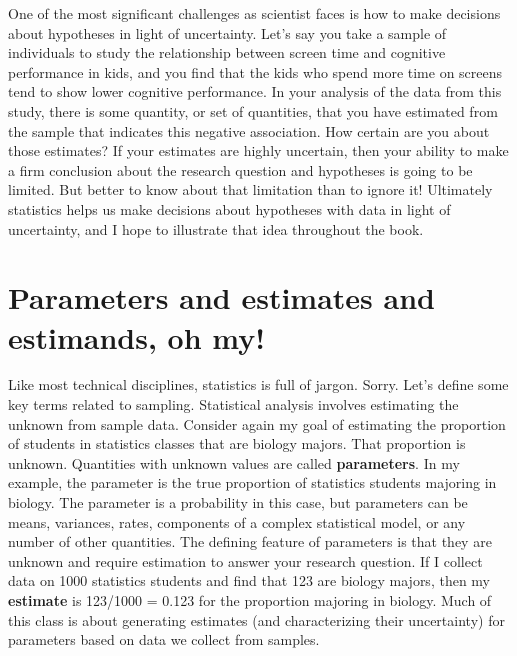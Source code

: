 \documentclass[
]{book}
\begin{document}
One of the most significant challenges as scientist faces is how to make decisions about hypotheses in light of uncertainty. Let's say you take a sample of individuals to study the relationship between screen time and cognitive performance in kids, and you find that the kids who spend more time on screens tend to show lower cognitive performance. In your analysis of the data from this study, there is some quantity, or set of quantities, that you have estimated from the sample that indicates this negative association. How certain are you about those estimates? If your estimates are highly uncertain, then your ability to make a firm conclusion about the research question and hypotheses is going to be limited. But better to know about that limitation than to ignore it! Ultimately statistics helps us make decisions about hypotheses with data in light of uncertainty, and I hope to illustrate that idea throughout the book.

\section{Parameters and estimates and estimands, oh my!}\label{parameters-and-estimates-and-estimands-oh-my}

Like most technical disciplines, statistics is full of jargon. Sorry. Let's define some key terms related to sampling. Statistical analysis involves estimating the unknown from sample data. Consider again my goal of estimating the proportion of students in statistics classes that are biology majors. That proportion is unknown. Quantities with unknown values are called \textbf{parameters}. In my example, the parameter is the true proportion of statistics students majoring in biology. The parameter is a probability in this case, but parameters can be means, variances, rates, components of a complex statistical model, or any number of other quantities. The defining feature of parameters is that they are unknown and require estimation to answer your research question. If I collect data on 1000 statistics students and find that 123 are biology majors, then my \textbf{estimate} is 123/1000 = 0.123 for the proportion majoring in biology. Much of this class is about generating estimates (and characterizing their uncertainty) for parameters based on data we collect from samples.
\end{document}
